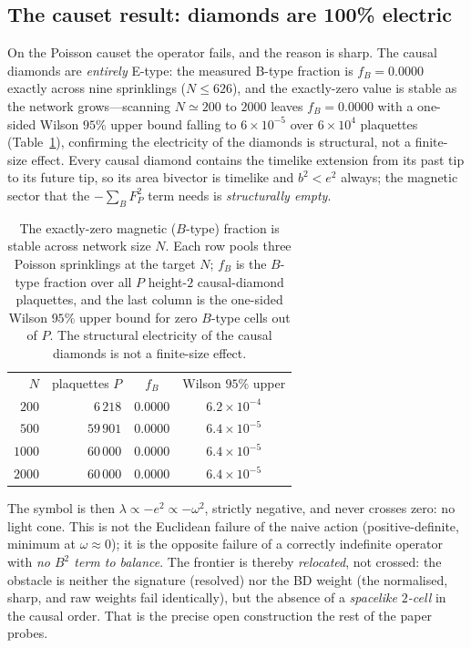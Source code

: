 \documentclass[aps,prd,reprint,nofootinbib,superscriptaddress,floatfix]{revtex4-2}
\newcommand{\fracB}{f_{\!B}}
\begin{document}
\subsection{The causet result: diamonds are 100\% electric}
On the Poisson causet the operator fails, and the reason is sharp. The causal diamonds
are \emph{entirely} E-type: the measured B-type fraction is $\fracB=0.0000$ exactly
across nine sprinklings ($N\le626$), and the exactly-zero value is stable as the
network grows---scanning $N\simeq200$ to $2000$ leaves $\fracB=0.0000$ with a
one-sided Wilson $95\%$ upper bound falling to $6\times10^{-5}$ over $6\times10^4$
plaquettes (Table~\ref{tab:fBN}), confirming the electricity of the diamonds is
structural, not a finite-size effect. Every causal diamond contains the timelike
extension from its past tip to its future tip, so its area bivector is timelike and
$b^2<e^2$ always; the magnetic sector that the $-\sum_B F_P^2$ term needs is
\emph{structurally empty}.

\begin{table}[t]
\caption{The exactly-zero magnetic ($B$-type) fraction is stable across network size
$N$. Each row pools three Poisson sprinklings at the target $N$; $\fracB$ is the
$B$-type fraction over all $P$ height-$2$ causal-diamond plaquettes, and the last
column is the one-sided Wilson $95\%$ upper bound for zero $B$-type cells out of $P$.
The structural electricity of the causal diamonds is not a finite-size effect.}
\label{tab:fBN}
\begin{ruledtabular}
\begin{tabular}{rrcc}
$N$ & plaquettes $P$ & $\fracB$ & Wilson $95\%$ upper \\
\colrule
$200$  & $6\,218$  & $0.0000$ & $6.2\times10^{-4}$ \\
$500$  & $59\,901$ & $0.0000$ & $6.4\times10^{-5}$ \\
$1000$ & $60\,000$ & $0.0000$ & $6.4\times10^{-5}$ \\
$2000$ & $60\,000$ & $0.0000$ & $6.4\times10^{-5}$ \\
\end{tabular}
\end{ruledtabular}
\end{table} The symbol is then $\lambda\propto-e^2\propto-\omega^2$,
strictly negative, and never crosses zero: no light cone. This is not the Euclidean
failure of the naive action (positive-definite, minimum at $\omega\approx0$); it is the
opposite failure of a correctly indefinite operator with \emph{no $B^2$ term to
balance}. The frontier is thereby \emph{relocated}, not crossed: the obstacle is neither
the signature (resolved) nor the BD weight (the normalised, sharp, and raw weights fail
identically), but the absence of a \emph{spacelike $2$-cell} in the causal order. That is
the precise open construction the rest of the paper probes.
\end{document}
